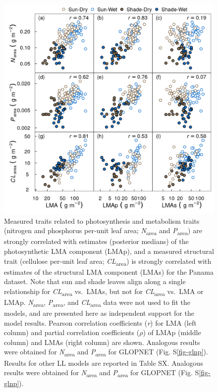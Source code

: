 \documentclass[
  12pt,
  a4paper,
,tablecaptionabove
]{scrartcl}
\begin{document}
\begin{figure}

{\centering \includegraphics{../figs/pa_point_npc.png}

}

\caption{\label{fig-PA-NPC}Measured traits related to photosynthesis and
metabolism traits (nitrogen and phosphorus per-unit leaf area;
\emph{N}\textsubscript{area} and \emph{P}\textsubscript{area}) are
strongly correlated with estimates (posterior medians) of the
photosynthetic LMA component (LMAp), and a measured structural trait
(cellulose per-unit leaf area; \emph{CL}\textsubscript{area}) is
strongly correlated with estimates of the structural LMA component
(LMAs) for the Panama dataset. Note that sun and shade leaves align
along a single relationship for \emph{CL}\textsubscript{area} vs.~LMAs,
but not for \emph{CL}\textsubscript{area} vs.~LMA or LMAp.
\emph{N}\textsubscript{area}, \emph{P}\textsubscript{area}, and
\emph{CL}\textsubscript{area} data were not used to fit the models, and
are presented here as independent support for the model results. Pearson
correlation coefficients (\emph{r}) for LMA (left column) and partial
correlation coefficients (\(\rho\)) of LMAp (middle column) and LMAs
(right column) are shown. Analogous results were obtained for
\emph{N}\textsubscript{area} and \emph{P}\textsubscript{area} for
GLOPNET (Fig. S\ref{fig-glnp}). Results for other LL models are reported
in Table SX. Analogous results were obtained for
\emph{N}\textsubscript{area} and \emph{P}\textsubscript{area} for
GLOPNET (Fig. S\ref{fig-glnp}).}

\end{figure}
\end{document}
